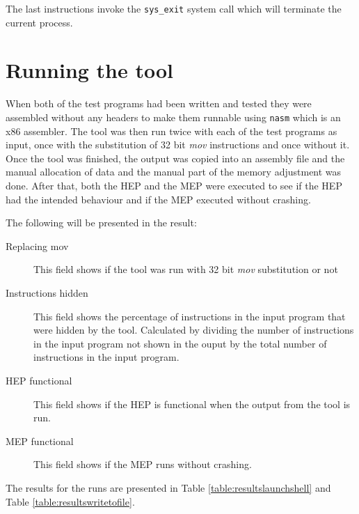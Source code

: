 \documentclass[11pt,twoside]{eitExjobb}
\begin{document}
\noindent The last instructions invoke the \texttt{sys\_exit} system call which will terminate the current process. 

\section{Running the tool}
When both of the test programs had been written and tested they were assembled without any headers to make them runnable using \texttt{nasm}\cite{nasm} which is an x86 assembler. The tool was then run twice with each of the test programs as input, once with the substitution of 32 bit \emph{mov} instructions and once without it. Once the tool was finished, the output was copied into an assembly file and the manual allocation of data and the manual part of the memory adjustment was done. After that, both the HEP and the MEP were executed to see if the HEP had the intended behaviour and if the MEP executed without crashing.

The following will be presented in the result:
\begin{description}
\item[Replacing mov] This field shows if the tool was run with 32 bit \emph{mov} substitution or not
\item[Instructions hidden] This field shows the percentage of instructions in the input program that were hidden by the tool. Calculated by dividing the number of instructions in the input program not shown in the ouput by the total number of instructions in the input program.
\item[HEP functional] This field shows if the HEP is functional when the output from the tool is run.
\item[MEP functional] This field shows if the MEP runs without crashing.
\end{description}

\noindent The results for the runs are presented in Table \ref{table:resultslaunchshell} and Table \ref{table:resultswritetofile}.
\end{document}
